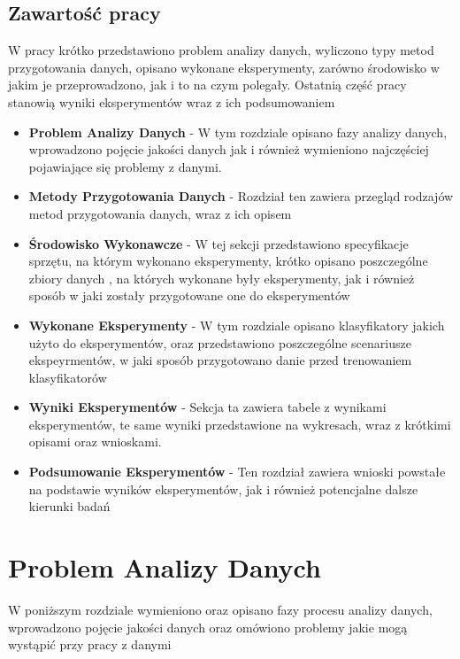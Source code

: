 \documentclass[oneside]{book}
\begin{document}
\section*{Zawartość pracy}
W pracy krótko przedstawiono problem analizy danych, wyliczono 
typy metod przygotowania danych, opisano wykonane eksperymenty, 
zarówno środowisko w jakim je przeprowadzono, jak i to na czym polegały.
Ostatnią część pracy stanowią wyniki eksperymentów wraz z ich podsumowaniem


\begin{itemize}
\item \textbf{Problem Analizy Danych} - W tym rozdziale opisano
 fazy analizy danych, wprowadzono pojęcie jakości danych jak i również 
wymieniono najczęściej pojawiające się problemy z danymi. 
\item \textbf{Metody Przygotowania Danych} - Rozdział ten 
zawiera przegląd rodzajów metod przygotowania danych, wraz z ich opisem
\item \textbf{Środowisko Wykonawcze} - W tej sekcji 
przedstawiono specyfikacje sprzętu, na którym wykonano 
eksperymenty, krótko opisano poszczególne zbiory danych
, na których wykonane były eksperymenty, jak i również 
sposób w jaki zostały przygotowane one do eksperymentów 
\item \textbf{Wykonane Eksperymenty} - W tym rozdziale 
opisano klasyfikatory jakich użyto do eksperymentów, 
oraz przedstawiono poszczególne scenariusze ekspeyrmentów, w 
jaki sposób przygotowano danie przed trenowaniem klasyfikatorów
\item \textbf{Wyniki Eksperymentów} - Sekcja ta zawiera tabele 
z wynikami eksperymentów, te same wyniki przedstawione 
na wykresach, wraz z krótkimi opisami oraz wnioskami.
\item \textbf{Podsumowanie Eksperymentów} - Ten rozdział 
zawiera wnioski powstałe na podstawie wyników eksperymentów, 
jak i również potencjalne dalsze kierunki badań

\end{itemize}

\chapter{Problem Analizy Danych}



W poniższym rozdziale wymieniono oraz opisano 
fazy procesu analizy danych, wprowadzono
pojęcie jakości danych oraz omówiono problemy 
jakie mogą wystąpić przy pracy z danymi
\end{document}

